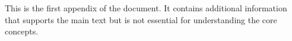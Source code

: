 \documentclass[12pt]{article}
\begin{document}
\fi

\ifdefined\standalonechapter\else
  \VAMtitlepage
\fi

\section*{\appendixtitle}
This is the first appendix of the document.
It contains additional information that supports the main text but is not essential for understanding the core concepts.



\ifdefined\standalonechapter
\else
    
    
    
\end{document}
